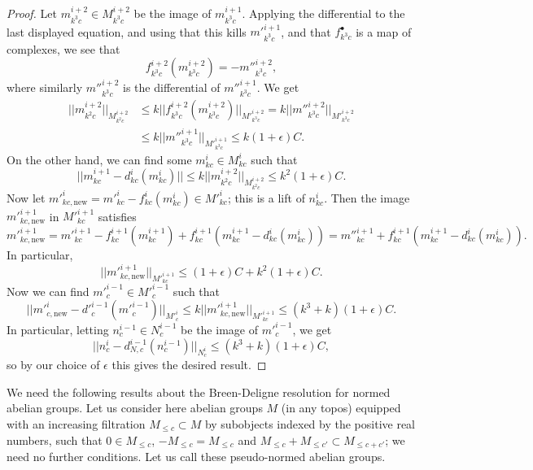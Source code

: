 \documentclass[11pt]{amsbook}
\numberwithin{equation}{section}
\numberwithin{theorem}{section}
\theoremstyle{definition}
\begin{document}
\begin{proof}
Let $m^{i+2}_{k^3c}\in M^{i+2}_{k^3c}$ be the image of $m^{i+1}_{k^3c}$. Applying the differential to the last displayed equation, and using that this kills $m'^{i+1}_{k^3c}$, and that $f^\bullet_{k^3c}$ is a map of complexes, we see that
\[
f^{i+2}_{k^3c}(m^{i+2}_{k^3c}) = -m''^{i+2}_{k^3c},
\]
where similarly $m''^{i+2}_{k^3c}$ is the differential of $m''^{i+1}_{k^3c}$. We get
\[\begin{aligned}
||m^{i+2}_{k^2c}||_{M^{i+2}_{k^2c}}&\leq k||f^{i+2}_{k^3c}(m^{i+2}_{k^3c})||_{M'^{i+2}_{k^3c}} = k||m''^{i+2}_{k^3c}||_{M'^{i+2}_{k^3c}}\\
&\leq k||m''^{i+1}_{k^3c}||_{M'^{i+1}_{k^3c}}\leq k(1+\epsilon)C.
\end{aligned}\]
On the other hand, we can find some $m^i_{kc}\in M^i_{kc}$ such that
\[
||m^{i+1}_{kc}-d^i_{kc}(m^i_{kc})||\leq k||m^{i+2}_{k^2c}||_{M^{i+2}_{k^2c}}\leq k^2(1+\epsilon)C.
\]
Now let $m'^i_{kc,\mathrm{new}} = m'^i_{kc}-f^i_{kc}(m^i_{kc})\in M'^i_{kc}$; this is a lift of $n^i_{kc}$. Then the image $m'^{i+1}_{kc,\mathrm{new}}$ in $M'^{i+1}_{kc}$ satisfies
\[
m'^{i+1}_{kc,\mathrm{new}} = m'^{i+1}_{kc}-f^{i+1}_{kc}(m^{i+1}_{kc}) + f^{i+1}_{kc}(m^{i+1}_{kc}-d^i_{kc}(m^i_{kc})) = m''^{i+1}_{kc} + f^{i+1}_{kc}(m^{i+1}_{kc}-d^i_{kc}(m^i_{kc})).
\]
In particular,
\[
||m'^{i+1}_{kc,\mathrm{new}}||_{M'^{i+1}_{kc}}\leq (1+\epsilon)C+ k^2(1+\epsilon)C.
\]
Now we can find $m'^{i-1}_c\in M'^{i-1}_c$ such that
\[
||m'^i_{c,\mathrm{new}} - d'^{i-1}_c(m'^{i-1}_c)||_{M'^i_c}\leq k||m'^{i+1}_{kc,\mathrm{new}}||_{M'^{i+1}_{kc}}\leq (k^3+k)(1+\epsilon)C.
\]
In particular, letting $n^{i-1}_c\in N^{i-1}_c$ be the image of $m'^{i-1}_c$, we get
\[
||n^i_c - d^{i-1}_{N,c}(n^{i-1}_c)||_{N^i_c}\leq (k^3+k)(1+\epsilon)C,
\]
so by our choice of $\epsilon$ this gives the desired result.
\end{proof}

We need the following results about the Breen-Deligne resolution for normed abelian groups. Let us consider here abelian groups $M$ (in any topos) equipped with an increasing filtration $M_{\leq c}\subset M$ by subobjects indexed by the positive real numbers, such that $0\in M_{\leq c}$, $-M_{\leq c} = M_{\leq c}$ and $M_{\leq c}+M_{\leq c'}\subset M_{\leq c+c'}$; we need no further conditions. Let us call these pseudo-normed abelian groups.
\end{document}

